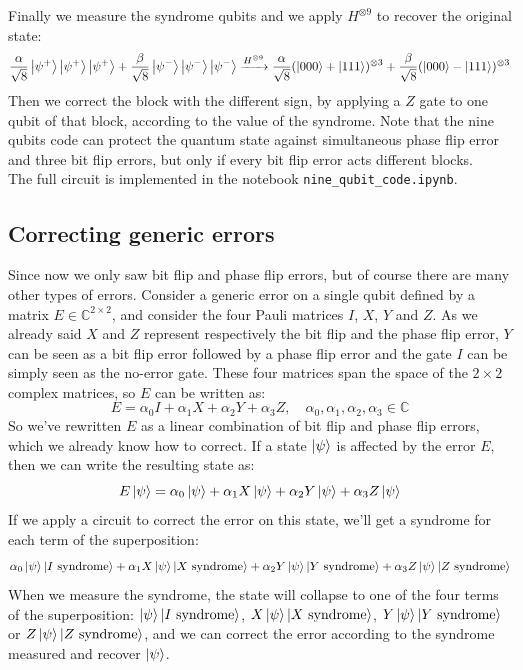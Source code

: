 \documentclass{article}
\begin{document}
	Finally we measure the syndrome qubits and we apply $H^{\otimes 9}$ to recover the original state:
	\[ \frac{\alpha}{\sqrt{8}}\ket{\psi^+}\ket{\psi^+}\ket{\psi^+} + \frac{\beta}{\sqrt{8}}\ket{\psi^-}\ket{\psi^-}\ket{\psi^-} \xrightarrow{H^{\otimes 9}} \frac{\alpha}{\sqrt{8}}(\ket{000} + \ket{111})^{\otimes 3} + \frac{\beta}{\sqrt{8}}(\ket{000} - \ket{111})^{\otimes 3} \]
	Then we correct the block with the different sign, by applying a $Z$ gate to one qubit of that block, according to the value of the syndrome. Note that the nine qubits code can protect the quantum state against simultaneous phase flip error and three bit flip errors, but only if every bit flip error acts different blocks.\\ The full circuit is implemented in the notebook \verb|nine_qubit_code.ipynb|.
	
	\subsection{Correcting generic errors}
	Since now we only saw bit flip and phase flip errors, but of course there are many other types of errors. Consider a generic error on a single qubit defined by a matrix $E \in \mathbb{C}^{2 \times 2}$, and consider the four Pauli matrices $I$, $X$, $Y$ and $Z$. As we already said $X$ and $Z$ represent respectively the bit flip and the phase flip error, $Y$ can be seen as a bit flip error followed by a phase flip error and the gate $I$ can be simply seen as the no-error gate. These four matrices span the space of the $2 \times 2$ complex matrices, so $E$ can be written as:
	\[ E = \alpha_0I + \alpha_1X + \alpha_2Y + \alpha_3Z, \quad \alpha_0, \alpha_1, \alpha_2, \alpha_3 \in \mathbb{C}\]
	So we've rewritten $E$ as a linear combination of bit flip and phase flip errors, which we already know how to correct. If a state $\ket{\psi}$ is affected by the error $E$, then we can write the resulting state as: 
	\[ E\ket{\psi} = \alpha_0\ket{\psi} + \alpha_1X\ket{\psi} + \alpha_2Y\ket{\psi} + \alpha_3Z\ket{\psi} \]
	If we apply a circuit to correct the error on this state, we'll get a syndrome for each term of the superposition:
	\[ \alpha_0\ket{\psi}\ket{I \text{ syndrome}} + \alpha_1X\ket{\psi}\ket{X \text{ syndrome}} + \alpha_2Y\ket{\psi}\ket{Y \text{ syndrome}} + \alpha_3Z\ket{\psi}\ket{Z \text{ syndrome}} \]
	When we measure the syndrome, the state will collapse to one of the four terms of the superposition: $\ket{\psi}\ket{I \text{ syndrome}}$, $X\ket{\psi}\ket{X \text{ syndrome}}$, $Y\ket{\psi}\ket{Y \text{ syndrome}}$ or $Z\ket{\psi}\ket{Z \text{ syndrome}}$, and we can correct the error according to the syndrome measured and recover $\ket{\psi}$.
	
\end{document}

